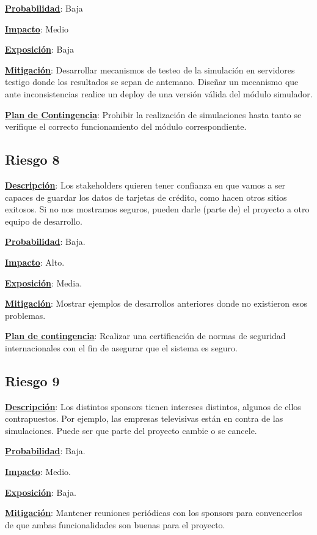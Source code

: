 \textbf{\underline{Probabilidad}}: Baja

\textbf{\underline{Impacto}}: Medio

\textbf{\underline{Exposición}}: Baja

\textbf{\underline{Mitigación}}: Desarrollar mecanismos de testeo de la simulación en servidores testigo donde los resultados se sepan de antemano. Diseñar un mecanismo que ante inconsistencias realice un deploy de una versión válida del módulo simulador.

\textbf{\underline{Plan de Contingencia}}: Prohibir la realización de simulaciones hasta tanto se verifique el correcto funcionamiento del módulo correspondiente.


\subsection*{Riesgo 8}
\textbf{\underline{Descripción}}: Los stakeholders quieren tener confianza en que vamos a ser capaces de guardar los datos de tarjetas de crédito, como hacen otros sitios exitosos. Si no nos mostramos seguros, pueden darle (parte de) el proyecto a otro equipo de desarrollo.

\textbf{\underline{Probabilidad}}: Baja.

\textbf{\underline{Impacto}}: Alto.

\textbf{\underline{Exposición}}: Media.

\textbf{\underline{Mitigación}}: Mostrar ejemplos de desarrollos anteriores donde no existieron esos problemas.

\textbf{\underline{Plan de contingencia}}: Realizar una certificación de normas de seguridad internacionales con el fin de asegurar que el sistema es seguro.

\subsection*{Riesgo 9}
\textbf{\underline{Descripción}}: Los distintos sponsors tienen intereses distintos, algunos de ellos contrapuestos. Por ejemplo, las empresas televisivas están en contra de las simulaciones. Puede ser que parte del proyecto cambie o se cancele.

\textbf{\underline{Probabilidad}}: Baja.

\textbf{\underline{Impacto}}: Medio.

\textbf{\underline{Exposición}}: Baja.

\textbf{\underline{Mitigación}}: Mantener reuniones periódicas con los sponsors para convencerlos de que ambas funcionalidades son buenas para el proyecto.

